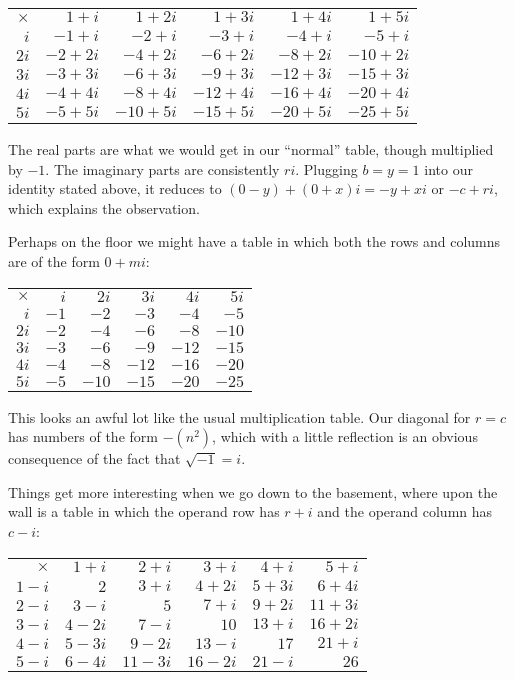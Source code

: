 \documentclass[12pt]{article}
\begin{document}
\begin{tabular}{|r|r|r|r|r|r|}
$\times$ & $1 + i$ & $1 + 2i$ & $1 + 3i$ & $1 + 4i$ & $1 + 5i$ \\
$i$ & $-1 + i$ & $-2 + i$ & $-3 + i$ & $-4 + i$ & $-5 + i$ \\
$2i$ & $-2 + 2i$ & $-4 + 2i$ & $-6 + 2i$ & $-8 + 2i$ & $-10 + 2i$ \\
$3i$ & $-3 + 3i$ & $-6 + 3i$ & $-9 + 3i$ & $-12 + 3i$ & $-15 + 3i$ \\
$4i$ & $-4 + 4i$ & $-8 + 4i$ & $-12 + 4i$ & $-16 + 4i$ & $-20 + 4i$ \\
$5i$ & $-5 + 5i$ & $-10 + 5i$ & $-15 + 5i$ & $-20 + 5i$ & $-25 + 5i$ \\
\end{tabular}

The real parts are what we would get in our ``normal'' table, though multiplied by $-1$. The imaginary parts are consistently $ri$. Plugging $b = y = 1$ into our identity stated above, it reduces to $(0 - y) + (0 + x)i = -y + xi$ or $-c + ri$, which explains the observation.

Perhaps on the floor we might have a table in which both the rows and columns are of the form $0 + mi$:

\begin{tabular}{|r|r|r|r|r|r|}
$\times$ & $i$ & $2i$ & $3i$ & $4i$ & $5i$ \\
$i$ & $-1$ & $-2$ & $-3$ & $-4$ & $-5$ \\
$2i$ & $-2$ & $-4$ & $-6$ & $-8$ & $-10$ \\
$3i$ & $-3$ & $-6$ & $-9$ & $-12$ & $-15$ \\
$4i$ & $-4$ & $-8$ & $-12$ & $-16$ & $-20$ \\
$5i$ & $-5$ & $-10$ & $-15$ & $-20$ & $-25$ \\
\end{tabular}

This looks an awful lot like the usual multiplication table. Our diagonal for $r = c$ has numbers of the form $-(n^2)$, which with a little reflection is an obvious consequence of the fact that $\sqrt{-1} = i$.

Things get more interesting when we go down to the basement, where upon the wall is a table in which the operand row has $r + i$ and the operand column has $c - i$:

\begin{tabular}{|r|r|r|r|r|r|} \\
$\times$ & $1 + i$ & $2 + i$ & $3 + i$ & $4 + i$ & $5 + i$ \\
$1 - i$ & $2$ & $3 +i$ & $4 + 2i$ & $5 + 3i$ & $6 + 4i$ \\
$2 - i$ & $3 - i$ & $5$ & $7 +i$ & $9 + 2i$ & $11 + 3i$ \\
$3 - i$ & $4 - 2i$ & $7 - i$ & $10$ & $13 +i$ & $16 + 2i$ \\
$4 - i$ & $5 - 3i$ & $9 - 2i$ & $13 - i$ & $17$ & $21 + i$ \\
$5 - i$ & $6 - 4i$ & $11 - 3i$ & $16 - 2i$ & $21 - i$ & $26$ \\ 
\end{tabular}
\end{document}
